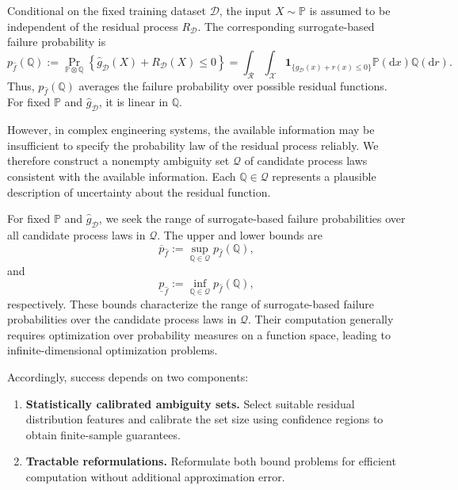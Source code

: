\documentclass[review,11pt,3p,authoryear,nopreprintline]{elsarticle}
\begin{document}
Conditional on the fixed training dataset $\mathcal{D}$, the input $X\sim\mathbb{P}$ is assumed to be independent of the residual process $R_{\mathcal{D}}$. The corresponding surrogate-based failure probability is
\begin{equation} 
    p_{\hat{f}}(\mathbb{Q}) 
    := \Pr_{\mathbb{P}\otimes\mathbb{Q}}
       \left\{
         \hat{g}_{\mathcal{D}}(X)+R_{\mathcal{D}}(X)\leq 0
       \right\} 
    = \int_{\mathcal{R}}
         \int_{\mathcal{X}}
         \mathbf{1}_{\{
           \hat{g}_{\mathcal{D}}(x)+r(x)\leq 0
         \}}
         \mathbb{P}(\mathrm{d}x)
       \mathbb{Q}(\mathrm{d}r). 
\end{equation}
Thus, $p_{\hat{f}}(\mathbb{Q})$ averages the failure probability over possible residual functions. For fixed $\mathbb{P}$ and $\hat{g}_{\mathcal{D}}$, it is linear in $\mathbb{Q}$.

However, in complex engineering systems, the available information may be insufficient to specify the probability law of the residual process reliably. We therefore construct a nonempty ambiguity set $\mathscr{Q}$ of candidate process laws consistent with the available information. Each $\mathbb{Q}\in\mathscr{Q}$ represents a plausible description of uncertainty about the residual function.

For fixed $\mathbb{P}$ and $\hat{g}_{\mathcal{D}}$, we seek the range of surrogate-based failure probabilities over all candidate process laws in $\mathscr{Q}$. The upper and lower bounds are
\begin{equation}
  \overline{p}_{\hat{f}}
  := \sup_{\mathbb{Q}\in\mathscr{Q}}
     p_{\hat{f}}(\mathbb{Q}),
  \label{eq-upper-bound}
\end{equation}
and
\begin{equation}
  \underline{p}_{\hat{f}}
  := \inf_{\mathbb{Q}\in\mathscr{Q}}
     p_{\hat{f}}(\mathbb{Q}),
  \label{eq-lower-bound}
\end{equation}
respectively. These bounds characterize the range of surrogate-based failure probabilities over the candidate process laws in $\mathscr{Q}$. Their computation generally requires optimization over probability measures on a function space, leading to infinite-dimensional optimization problems.

Accordingly, success depends on two components:
\begin{enumerate}
  \item \textbf{Statistically calibrated ambiguity sets.} Select suitable residual distribution features and calibrate the set size using confidence regions to obtain finite-sample guarantees.
  \item \textbf{Tractable reformulations.} Reformulate both bound problems for efficient computation without additional approximation error.
\end{enumerate}
\end{document}
